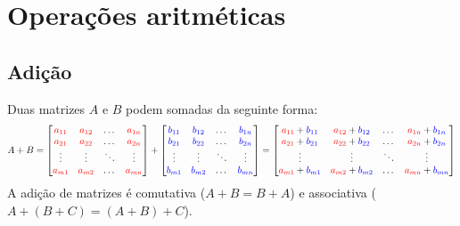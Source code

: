 \documentclass[]{report}
\begin{document}
\section{Operações aritméticas}
\subsection{Adição}
Duas matrizes $A$ e $B$ podem somadas da seguinte forma:
$$A+B = 
\begin{bmatrix}
\color{red}a_{11} & \color{red}a_{12} & \dots & \color{red}a_{1n} \\
\color{red}a_{21} & \color{red}a_{22} & \dots & \color{red}a_{2n} \\
\vdots & \vdots & \ddots & \vdots \\
\color{red}a_{m1} & \color{red}a_{m2} & \dots & \color{red}a_{mn}
\end{bmatrix}
+
\begin{bmatrix}
\color{blue}b_{11} & \color{blue}b_{12} & \dots & \color{blue}b_{1n} \\
\color{blue}b_{21} & \color{blue}b_{22} & \dots & \color{blue}b_{2n} \\
\vdots & \vdots & \ddots & \vdots \\
\color{blue}b_{m1} & \color{blue}b_{m2} & \dots & \color{blue}b_{mn}
\end{bmatrix}
=
\begin{bmatrix}
\textcolor{red}{a_{11}}+\textcolor{blue}{b_{11}} & \textcolor{red}{a_{12}}+\textcolor{blue}{b_{12}} & \dots & \textcolor{red}{a_{1n}}+\textcolor{blue}{b_{1n}} \\
\textcolor{red}{a_{21}}+\textcolor{blue}{b_{21}} & \textcolor{red}{a_{22}}+\textcolor{blue}{b_{22}} & \dots & \textcolor{red}{a_{2n}}+\textcolor{blue}{b_{2n}} \\
\vdots & \vdots & \ddots & \vdots \\
\textcolor{red}{a_{m1}}+\textcolor{blue}{b_{m1}} & \textcolor{red}{a_{m2}}+\textcolor{blue}{b_{m2}} & \dots & \textcolor{red}{a_{mn}}+\textcolor{blue}{b_{mn}}
\end{bmatrix}$$
A adição de matrizes é comutativa ($A+B = B+A$) e associativa ($A+(B+C) = (A+B)+C$).
\end{document}
